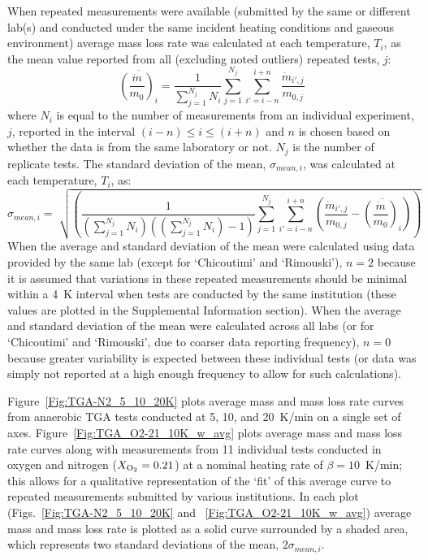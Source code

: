 \documentclass{book}
\begin{document}
When repeated measurements were available (submitted by the same or different lab(s) and conducted under the same incident heating conditions and gaseous environment) average mass loss rate was calculated at each temperature, $T_i$, as the mean value reported from all (excluding noted outliers) repeated tests, $j$:
\begin{equation}
\overline{\left(\frac{\dot{m}}{m_0}\right)_i} = \frac{1}{\sum_{j=1}^{N_j}N_i} \sum_{j=1}^{N_j} \sum_{i'=i-n}^{i+n} \frac{\dot{m}_{i',j}}{m_{0,j}}
\end{equation}
where $N_i$ is equal to the number of measurements from an individual experiment, $j$, reported in the interval $(i-n) \leq i \leq (i+n)$ and $n$ is chosen based on whether the data is from the same laboratory or not. $N_j$ is the number of replicate tests. The standard deviation of the mean,   $\sigma_{mean,i}$, was calculated at each temperature, $T_i$, as:
\begin{equation}
  \sigma_{mean,i} = \sqrt[]{\left(\frac{1}{(\sum_{j=1}^{N_j}N_i)((\sum_{j=1}^{N_j}N_i)-1)} \sum_{j=1}^{N_j} \sum_{i'=i-n}^{i+n}  \left(\frac{\dot{m}_{i',j}}{m_{0,j}} - \overline{\left(\frac{\dot{m}}{m_0}\right)_i} \right)\right)}
\end{equation}
When the average and standard deviation of the mean were calculated using data provided by the same lab (except for ‘Chicoutimi’ and ‘Rimouski’), $n=2$ because it is assumed that variations in these repeated measurements should be minimal within a 4~K interval when tests are conducted by the same institution (these values are plotted in the Supplemental Information section). When the average and standard deviation of the mean were calculated across all labs (or for ‘Chicoutimi’ and ‘Rimouski’, due to coarser data reporting frequency), $n=0$ because greater variability is expected between these individual tests (or data was simply not reported at a high enough frequency to allow for such calculations).

Figure~\ref{Fig:TGA-N2_5_10_20K} plots average mass and mass loss rate curves from anaerobic TGA tests conducted at 5, 10, and 20~K/min on a single set of axes. Figure~\ref{Fig:TGA_O2-21_10K_w_avg} plots average mass and mass loss rate curves along with measurements from 11 individual tests conducted in oxygen and nitrogen ($X_{\rm O_2}=0.21$) at a nominal heating rate of $\beta=10$~K/min; this allows for a qualitative representation of the ‘fit’ of this average curve to repeated measurements submitted by various institutions. In each plot (Figs.~\ref{Fig:TGA-N2_5_10_20K} and ~\ref{Fig:TGA_O2-21_10K_w_avg}) average mass and mass loss rate is plotted as a solid curve surrounded by a shaded area, which represents two standard deviations of the mean, $2 \sigma_{mean,i}$.
\end{document}
